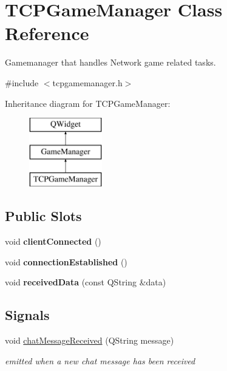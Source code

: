 \hypertarget{class_t_c_p_game_manager}{\section{T\-C\-P\-Game\-Manager Class Reference}
\label{class_t_c_p_game_manager}
}


Gamemanager that handles Network game related tasks.  




{\ttfamily \#include $<$tcpgamemanager.\-h$>$}

Inheritance diagram for T\-C\-P\-Game\-Manager\-:\begin{figure}[H]
\begin{center}
\leavevmode
\includegraphics[height=3.000000cm]{class_t_c_p_game_manager}
\end{center}
\end{figure}
\subsection*{Public Slots}
\begin{DoxyCompactItemize}
\item 
\hypertarget{class_t_c_p_game_manager_a616b05b986023096f7475e32c70a059d}{void {\bfseries client\-Connected} ()}\label{class_t_c_p_game_manager_a616b05b986023096f7475e32c70a059d}

\item 
\hypertarget{class_t_c_p_game_manager_a65421be056b0c53a6deed1bd405ffc6b}{void {\bfseries connection\-Established} ()}\label{class_t_c_p_game_manager_a65421be056b0c53a6deed1bd405ffc6b}

\item 
\hypertarget{class_t_c_p_game_manager_a6412d2d4a43e5ff353d410e810f60675}{void {\bfseries received\-Data} (const Q\-String \&data)}\label{class_t_c_p_game_manager_a6412d2d4a43e5ff353d410e810f60675}

\end{DoxyCompactItemize}
\subsection*{Signals}
\begin{DoxyCompactItemize}
\item 
\hypertarget{class_t_c_p_game_manager_ab3a7b1cacfd6ca1704d683f5bc794d98}{void \hyperlink{class_t_c_p_game_manager_ab3a7b1cacfd6ca1704d683f5bc794d98}{chat\-Message\-Received} (Q\-String message)}\label{class_t_c_p_game_manager_ab3a7b1cacfd6ca1704d683f5bc794d98}

\begin{DoxyCompactList}\small\item\em emitted when a new chat message has been received \end{DoxyCompactList}\end{DoxyCompactItemize}
